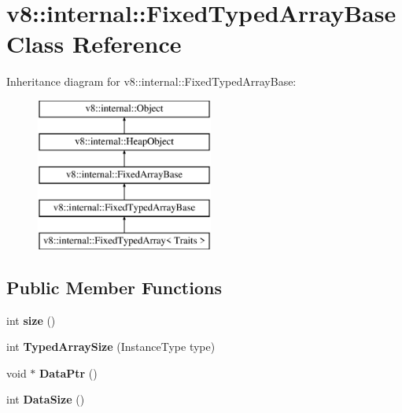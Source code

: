 \hypertarget{classv8_1_1internal_1_1_fixed_typed_array_base}{}\section{v8\+:\+:internal\+:\+:Fixed\+Typed\+Array\+Base Class Reference}
\label{classv8_1_1internal_1_1_fixed_typed_array_base}
Inheritance diagram for v8\+:\+:internal\+:\+:Fixed\+Typed\+Array\+Base\+:\begin{figure}[H]
\begin{center}
\leavevmode
\includegraphics[height=5.000000cm]{classv8_1_1internal_1_1_fixed_typed_array_base}
\end{center}
\end{figure}
\subsection*{Public Member Functions}
\begin{DoxyCompactItemize}
\item 
\hypertarget{classv8_1_1internal_1_1_fixed_typed_array_base_a8654be3c7948a5128d0747d9afc7d7a4}{}int {\bfseries size} ()\label{classv8_1_1internal_1_1_fixed_typed_array_base_a8654be3c7948a5128d0747d9afc7d7a4}

\item 
\hypertarget{classv8_1_1internal_1_1_fixed_typed_array_base_abeba9a1a849eed61d781b68734a1bcd1}{}int {\bfseries Typed\+Array\+Size} (Instance\+Type type)\label{classv8_1_1internal_1_1_fixed_typed_array_base_abeba9a1a849eed61d781b68734a1bcd1}

\item 
\hypertarget{classv8_1_1internal_1_1_fixed_typed_array_base_aee400ef42723b06367f5daf53bbcf89e}{}void $\ast$ {\bfseries Data\+Ptr} ()\label{classv8_1_1internal_1_1_fixed_typed_array_base_aee400ef42723b06367f5daf53bbcf89e}

\item 
\hypertarget{classv8_1_1internal_1_1_fixed_typed_array_base_a1f6f417d9de199d53788cbde53da222c}{}int {\bfseries Data\+Size} ()\label{classv8_1_1internal_1_1_fixed_typed_array_base_a1f6f417d9de199d53788cbde53da222c}

\end{DoxyCompactItemize}
